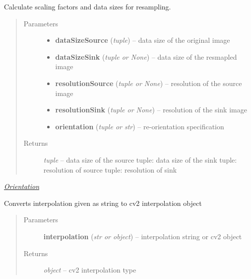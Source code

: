 \documentclass[letterpaper,10pt,english]{sphinxmanual}
\begin{document}
\begin{fulllineitems}
\label{api/ClearMap.Alignment:ClearMap.Alignment.Resampling.resampleDataSize}
Calculate scaling factors and data sizes for resampling.
\begin{quote}\begin{description}
\item[{Parameters}] \leavevmode\begin{itemize}
\item {} 
\textbf{dataSizeSource} (\emph{tuple}) --
data size of the original image

\item {} 
\textbf{dataSizeSink} (\emph{tuple or None}) --
data size of the resmapled image

\item {} 
\textbf{resolutionSource} (\emph{tuple or None}) --
resolution of the source image

\item {} 
\textbf{resolutionSink} (\emph{tuple or None}) --
resolution of the sink image

\item {} 
\textbf{orientation} (\emph{tuple or str}) --
re-orientation specification

\end{itemize}

\item[{Returns}] \leavevmode
\emph{tuple} --
data size of the source
tuple: data size of the sink
tuple: resolution of source
tuple: resolution of sink

\end{description}\end{quote}




{\hyperref[api/ClearMap.Alignment:orientation]{\emph{Orientation}}}



\end{fulllineitems}


\begin{fulllineitems}
\label{api/ClearMap.Alignment:ClearMap.Alignment.Resampling.fixInterpolation}
Converts interpolation given as string to cv2 interpolation object
\begin{quote}\begin{description}
\item[{Parameters}] \leavevmode
\textbf{interpolation} (\emph{str or object}) --
interpolation string or cv2 object

\item[{Returns}] \leavevmode
\emph{object} --
cv2 interpolation type

\end{description}\end{quote}

\end{fulllineitems}
\end{document}

